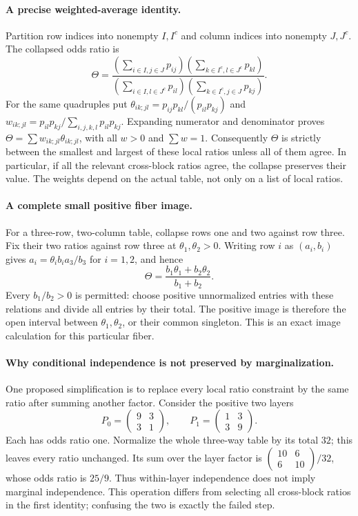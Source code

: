 \documentclass[11pt]{article}
\begin{document}
\paragraph{A precise weighted-average identity.}
Partition row indices into nonempty $I,I^c$ and column indices into
nonempty $J,J^c$. The collapsed odds ratio is
\[
\Theta=\frac{(\sum_{i\in I,j\in J}p_{ij})
(\sum_{k\in I^c,l\in J^c}p_{kl})}
{(\sum_{i\in I,l\in J^c}p_{il})
(\sum_{k\in I^c,j\in J}p_{kj})}.
\]
For the same quadruples put
$\theta_{ik;jl}=p_{ij}p_{kl}/(p_{il}p_{kj})$ and
$w_{ik;jl}=p_{il}p_{kj}/\sum_{i,j,k,l}p_{il}p_{kj}$.
Expanding numerator and denominator proves
$\Theta=\sum w_{ik;jl}\theta_{ik;jl}$, with all $w>0$ and $\sum w=1$.
Consequently $\Theta$ is strictly between the smallest and largest of
these local ratios unless all of them agree. In particular, if all the
relevant cross-block ratios agree, the collapse preserves their value.
The weights depend on the actual table, not only on a list of local ratios.

\paragraph{A complete small positive fiber image.}
For a three-row, two-column table, collapse rows one and two against row
three. Fix their two ratios against row three at $\theta_1,\theta_2>0$.
Writing row $i$ as $(a_i,b_i)$ gives
$a_i=\theta_i b_i a_3/b_3$ for $i=1,2$, and hence
\[
\Theta=\frac{b_1\theta_1+b_2\theta_2}{b_1+b_2}.
\]
Every $b_1/b_2>0$ is permitted: choose positive unnormalized entries with
these relations and divide all entries by their total. The positive image
is therefore the open interval between $\theta_1,\theta_2$, or their common
singleton. This is an exact image calculation for this particular fiber.

\paragraph{Why conditional independence is not preserved by marginalization.}
One proposed simplification is to replace every local ratio constraint by
the same ratio after summing another factor. Consider the positive two
layers
\[
P_0=\begin{pmatrix}9&3\\3&1\end{pmatrix},\qquad
P_1=\begin{pmatrix}1&3\\3&9\end{pmatrix}.
\]
Each has odds ratio one. Normalize the whole three-way table by its total
$32$; this leaves every ratio unchanged. Its sum over the layer factor is
$\left(\begin{smallmatrix}10&6\\6&10\end{smallmatrix}\right)/32$,
whose odds ratio is $25/9$. Thus within-layer independence does not imply
marginal independence. This operation differs from selecting all cross-block
ratios in the first identity; confusing the two is exactly the failed step.
\end{document}
